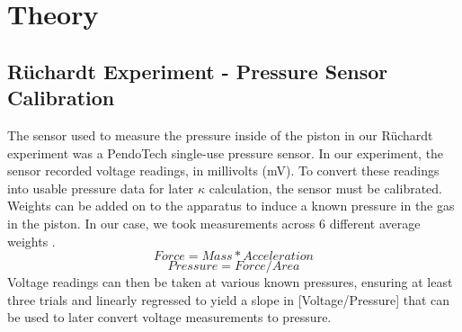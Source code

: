 \documentclass[lettersize,journal]{IEEEtran}
\begin{document}
	
	\section{Theory}
	\subsection{Rüchardt Experiment - Pressure Sensor Calibration}
	The sensor used to measure the pressure inside of the piston in our Rüchardt experiment was a PendoTech single-use pressure sensor. In our experiment, the sensor recorded voltage readings, in millivolts (mV). To convert these readings into usable pressure data for later $\kappa$ calculation, the sensor must be calibrated. Weights can be added on to the apparatus to induce a known pressure in the gas in the piston. In our case, we took measurements across 6 different average weights \cite{ref1}. 
	\begin{equation}
		\label{deqn_ex1}
		Force = Mass * Acceleration
	\end{equation}
	\begin{equation}
		\label{deqn_ex2}
		Pressure = Force / Area
	\end{equation}
	Voltage readings can then be taken at various known pressures, ensuring at least three trials and linearly regressed to yield a slope in [Voltage/Pressure] that can be used to later convert voltage measurements to pressure.
	
\end{document}
